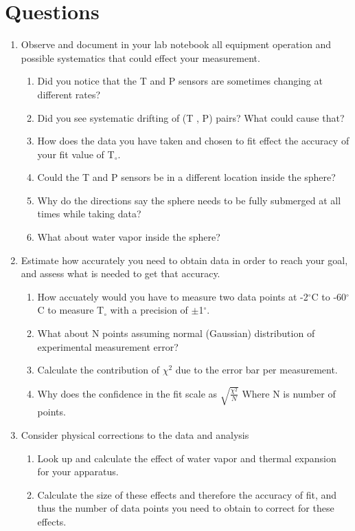 \documentclass[12pt]{report}
\begin{document}
\section{Questions}
\begin{enumerate}
	  \item Observe and document in your lab notebook all equipment operation and possible systematics that could effect your measurement.
 	 \begin{enumerate}
  		  \item Did you notice that the T and P sensors are sometimes changing at different rates?
  		  \item Did you see systematic drifting of (T , P) pairs? What could cause that?
 		   \item How does the data you have taken and chosen to fit effect the accuracy of your fit value of T$_{\circ}$.
 		   \item Could the T and P sensors be in a different location inside the sphere?
   		  \item Why do the directions say the sphere needs to be fully submerged at all times while taking data?
   		  \item What about water vapor inside the sphere?
  	\end{enumerate}
 
	\item  Estimate how accurately you need to obtain data in order to reach your goal, and assess what is needed to get that accuracy.
	\begin{enumerate}
		\item How accuately would you have to measure two data points at -2$^{\circ}$C to -60$^{\circ}$C to measure T$_{\circ}$ with a precision of $\pm$1$^{\circ}$.
		\item What about N points assuming normal (Gaussian) distribution of experimental measurement error?
		\item Calculate the contribution of  $ \chi ^2$ due to the error bar per measurement.
		\item Why does the confidence in the fit scale as $\sqrt{\frac{\chi ^2}{N}}$ Where N is number of points.
	\end{enumerate}


	\item Consider physical corrections to the data and analysis
	 \begin{enumerate}
		\item Look up and calculate the effect of water vapor and thermal expansion for your apparatus.
		\item Calculate the size of these effects and therefore the accuracy of fit, and thus the number of data points you need to obtain to correct for these effects.
	\end{enumerate}


\end{enumerate}
\end{document}
